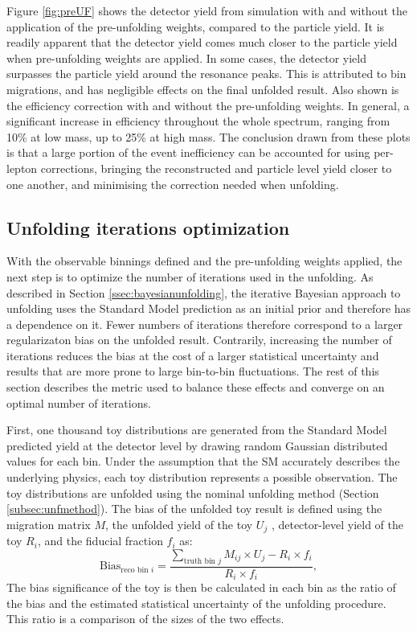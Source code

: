 Figure \ref{fig:preUF} shows the detector yield from simulation with and without the application of the pre-unfolding weights, compared to the particle yield. It is readily apparent that the detector yield comes much closer to the particle yield when pre-unfolding weights are applied. In some cases, the detector yield surpasses the particle yield around the resonance peaks. This is attributed to bin migrations, and has negligible effects on the final unfolded result. Also shown is the efficiency correction with and without the pre-unfolding weights. In general, a significant increase in efficiency throughout the whole \mFourL{} spectrum, ranging from 10\% at low mass, up to 25\% at high mass. The conclusion drawn from these plots is that a large portion of the event inefficiency can be accounted for using per-lepton corrections, bringing the reconstructed and particle level yield closer to one another, and minimising the correction needed when unfolding.

\subsection{Unfolding iterations optimization}
\label{ssec:unfoldingiterations}
With the observable binnings defined and the pre-unfolding weights applied, the next step is to optimize the number of iterations used in the unfolding. As described in Section \ref{ssec:bayesianunfolding}, the iterative Bayesian approach to unfolding uses the Standard Model prediction as an initial prior and therefore has a dependence on it. Fewer numbers of iterations therefore correspond to a larger regularizaton bias on the unfolded result. Contrarily, increasing the number of iterations reduces the bias at the cost of a larger statistical uncertainty and results that are more prone to large bin-to-bin fluctuations. The rest of this section describes the metric used to balance these effects and converge on an optimal number of iterations.

First, one thousand toy distributions are generated from the Standard Model predicted yield at the detector level by drawing random Gaussian distributed values for each bin. Under the assumption that the SM accurately describes the underlying physics, each toy distribution represents a possible observation. The toy distributions are unfolded using the nominal unfolding method (Section \ref{subsec:unfmethod}). The bias of the unfolded toy result is defined using the migration matrix $M$, the unfolded yield of the toy $U_{j}$ , detector-level yield of the toy $R_i$, and the fiducial fraction $f_i$ as:
\begin{equation*}
  \text{Bias}_{\text{reco bin }i} = \frac{\sum\limits_{\text{truth bin }j} M_{ij} \times U_{j} - R_{i} \times f_{i} }{R_{i} \times f_{i}},
\end{equation*}
The bias significance of the toy is then be calculated in each bin as the ratio of the bias and the estimated statistical uncertainty of the unfolding procedure. This ratio is a comparison of the sizes of the two effects. 

